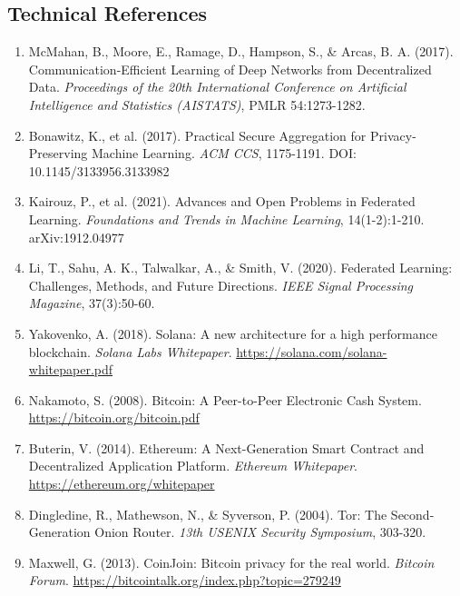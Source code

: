 \documentclass[11pt,a4paper]{article}
\begin{document}
\subsection*{Technical References}

\begin{enumerate}
    \item McMahan, B., Moore, E., Ramage, D., Hampson, S., \& Arcas, B. A. (2017). Communication-Efficient Learning of Deep Networks from Decentralized Data. \textit{Proceedings of the 20th International Conference on Artificial Intelligence and Statistics (AISTATS)}, PMLR 54:1273-1282.

    \item Bonawitz, K., et al. (2017). Practical Secure Aggregation for Privacy-Preserving Machine Learning. \textit{ACM CCS}, 1175-1191. DOI: 10.1145/3133956.3133982

    \item Kairouz, P., et al. (2021). Advances and Open Problems in Federated Learning. \textit{Foundations and Trends in Machine Learning}, 14(1-2):1-210. arXiv:1912.04977

    \item Li, T., Sahu, A. K., Talwalkar, A., \& Smith, V. (2020). Federated Learning: Challenges, Methods, and Future Directions. \textit{IEEE Signal Processing Magazine}, 37(3):50-60.

    \item Yakovenko, A. (2018). Solana: A new architecture for a high performance blockchain. \textit{Solana Labs Whitepaper}. \url{https://solana.com/solana-whitepaper.pdf}

    \item Nakamoto, S. (2008). Bitcoin: A Peer-to-Peer Electronic Cash System. \url{https://bitcoin.org/bitcoin.pdf}

    \item Buterin, V. (2014). Ethereum: A Next-Generation Smart Contract and Decentralized Application Platform. \textit{Ethereum Whitepaper}. \url{https://ethereum.org/whitepaper}

    \item Dingledine, R., Mathewson, N., \& Syverson, P. (2004). Tor: The Second-Generation Onion Router. \textit{13th USENIX Security Symposium}, 303-320.

    \item Maxwell, G. (2013). CoinJoin: Bitcoin privacy for the real world. \textit{Bitcoin Forum}. \url{https://bitcointalk.org/index.php?topic=279249}


\end{enumerate}
\end{document}
